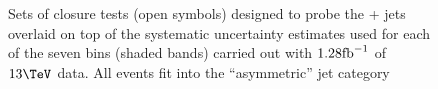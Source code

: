 \begin{figure}[h!]
  \begin{center}
     ~~
     \\
     ~~
     \\
    \caption{Sets of closure tests (open symbols) designed to probe
      the \znunu + jets overlaid on top of
      the systematic uncertainty estimates used for each of the seven
      \scalht bins (shaded bands) carried out with $1.28\text{fb}^{-1}$ of
      $13\tev$ data. All events fit into the ``asymmetric'' jet
      category}
    \label{fig:ZinvclosureDataAsym}
  \end{center} 
\end{figure}

